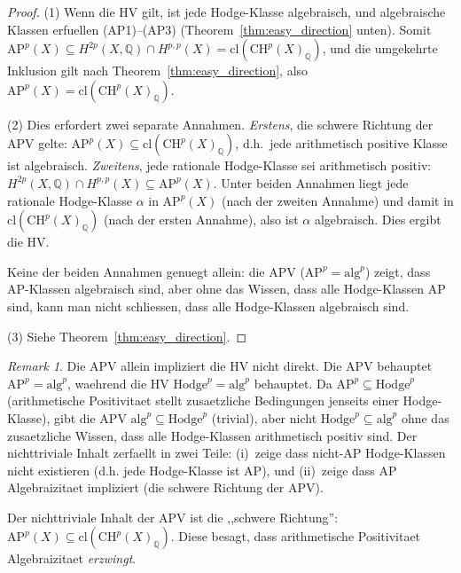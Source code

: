 \documentclass[aps,prd,twocolumn,superscriptaddress,nofootinbib]{revtex4-2}
\theoremstyle{definition}
\theoremstyle{remark}
\newtheorem{remark}[theorem]{Remark}
\begin{document}
\begin{proof}
(1) Wenn die HV gilt, ist jede Hodge-Klasse algebraisch, und algebraische Klassen erfuellen (AP1)--(AP3) (Theorem~\ref{thm:easy_direction} unten). Somit $\mathrm{AP}^p(X) \subseteq H^{2p}(X, \mathbb{Q}) \cap H^{p,p}(X) = \mathrm{cl}(\mathrm{CH}^p(X)_\mathbb{Q})$, und die umgekehrte Inklusion gilt nach Theorem~\ref{thm:easy_direction}, also $\mathrm{AP}^p(X) = \mathrm{cl}(\mathrm{CH}^p(X)_\mathbb{Q})$.

(2) Dies erfordert zwei separate Annahmen. \textit{Erstens}, die schwere Richtung der APV gelte: $\mathrm{AP}^p(X) \subseteq \mathrm{cl}(\mathrm{CH}^p(X)_\mathbb{Q})$, d.h.\ jede arithmetisch positive Klasse ist algebraisch. \textit{Zweitens}, jede rationale Hodge-Klasse sei arithmetisch positiv: $H^{2p}(X, \mathbb{Q}) \cap H^{p,p}(X) \subseteq \mathrm{AP}^p(X)$. Unter beiden Annahmen liegt jede rationale Hodge-Klasse $\alpha$ in $\mathrm{AP}^p(X)$ (nach der zweiten Annahme) und damit in $\mathrm{cl}(\mathrm{CH}^p(X)_\mathbb{Q})$ (nach der ersten Annahme), also ist $\alpha$ algebraisch. Dies ergibt die HV.

Keine der beiden Annahmen genuegt allein: die APV ($\mathrm{AP}^p = \mathrm{alg}^p$) zeigt, dass AP-Klassen algebraisch sind, aber ohne das Wissen, dass alle Hodge-Klassen AP sind, kann man nicht schliessen, dass alle Hodge-Klassen algebraisch sind.

(3) Siehe Theorem~\ref{thm:easy_direction}.
\end{proof}

\begin{remark}
Die APV allein impliziert die HV nicht direkt. Die APV behauptet $\mathrm{AP}^p = \mathrm{alg}^p$, waehrend die HV $\mathrm{Hodge}^p = \mathrm{alg}^p$ behauptet. Da $\mathrm{AP}^p \subseteq \mathrm{Hodge}^p$ (arithmetische Positivitaet stellt zusaetzliche Bedingungen jenseits einer Hodge-Klasse), gibt die APV $\mathrm{alg}^p \subseteq \mathrm{Hodge}^p$ (trivial), aber nicht $\mathrm{Hodge}^p \subseteq \mathrm{alg}^p$ ohne das zusaetzliche Wissen, dass alle Hodge-Klassen arithmetisch positiv sind. Der nichttriviale Inhalt zerfaellt in zwei Teile: (i)~zeige dass nicht-AP Hodge-Klassen nicht existieren (d.h. jede Hodge-Klasse ist AP), und (ii)~zeige dass AP Algebraizitaet impliziert (die schwere Richtung der APV).
\end{remark}

Der nichttriviale Inhalt der APV ist die ,,schwere Richtung'': $\mathrm{AP}^p(X) \subseteq \mathrm{cl}(\mathrm{CH}^p(X)_\mathbb{Q})$. Diese besagt, dass arithmetische Positivitaet Algebraizitaet \textit{erzwingt}.
\end{document}
